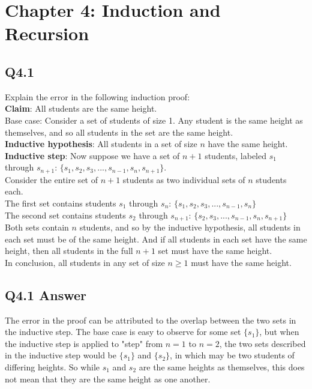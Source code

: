 \documentclass{article}
\begin{document}
\section*{Chapter 4: Induction and Recursion}

\subsection*{Q4.1}
Explain the error in the following induction proof:
\\ \textbf{Claim}: All students are the same height.
\\ Base case: Consider a set of students of size 1. Any student is the same height as themselves, and so all students in the set are the same height.
\\ \textbf{Inductive hypothesis}: All students in a set of size $n$ have the same height. 
\\ \textbf{Inductive step}: Now suppose we have a set of $n+1$ students, labeled $s_1$ through $s_{n+1}$: $\{s_1,s_2,s_3,...,s_{n-1},s_n,s_{n+1}\}$.
\\ Consider the entire set of $n+1$ students as two individual sets of $n$ students each.
\\ The first set contains students $s_1$ through $s_n$: $\{s_1,s_2,s_3,...,s_{n-1},s_n\}$
\\ The second set contains students $s_2$ through $s_{n+1}$: $\{s_2,s_3,...,s_{n-1},s_n,s_{n+1}\}$
\\ Both sets contain $n$ students, and so by the inductive hypothesis, all students in each set must be of the same height. And if all students in each set have the same height, then all students in the full $n+1$ set must have the same height.
\\ In conclusion, all students in any set of size $n\geq1$ must have the same height.
\newpage
\subsection*{Q4.1 Answer}
The error in the proof can be attributed to the overlap between the two sets in the inductive step. The base case is easy to observe for some set $\{s_1\}$, but when the inductive step is applied to "step" from $n=1$ to $n=2$, the two sets described in the inductive step would be $\{s_1\}$ and $\{s_2\}$, in which may be two students of differing heights. So while $s_1$ and $s_2$ are the same heights as themselves, this does not mean that they are the same height as one another.
\newpage
\end{document}
